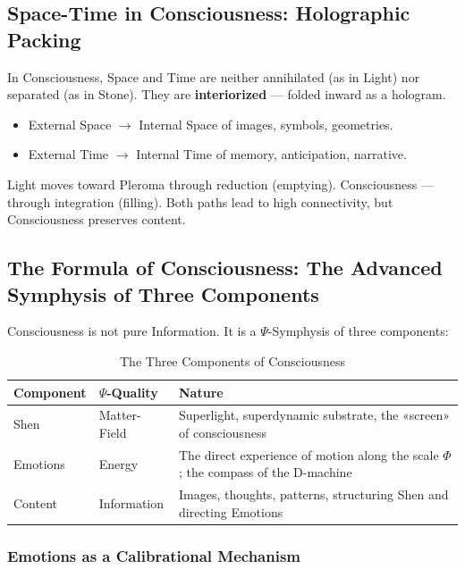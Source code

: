 \documentclass[a4paper,12pt]{article}
\begin{document}
	\subsection{Space-Time in Consciousness: Holographic Packing}
	
	In Consciousness, Space and Time are neither annihilated (as in Light) nor separated (as in Stone). They are \textbf{interiorized} — folded inward as a hologram.
	
	\begin{itemize}
		\item External Space $\to$ Internal Space of images, symbols, geometries.
		\item External Time $\to$ Internal Time of memory, anticipation, narrative.
	\end{itemize}
	
	Light moves toward Pleroma through reduction (emptying). Consciousness — through integration (filling). Both paths lead to high connectivity, but Consciousness preserves content.
	
	\subsection{The Formula of Consciousness: The Advanced Symphysis of Three Components}
	
	Consciousness is not pure Information. It is a $\Psi$-Symphysis of three components:
	
	\begin{table}[H]
		\centering
		\begin{tabular}{|p{3.5cm}|p{3.5cm}|p{8.5cm}|}
			\hline
			\textbf{Component} & \textbf{$\Psi$-Quality} & \textbf{Nature} \\
			\hline
			Shen & Matter-Field & Superlight, superdynamic substrate, the «screen» of consciousness \\
			\hline
			Emotions & Energy & The direct experience of motion along the scale $\Phi$; the compass of the D-machine \\
			\hline
			Content & Information & Images, thoughts, patterns, structuring Shen and directing Emotions \\
			\hline
		\end{tabular}
		\caption{The Three Components of Consciousness}
	\end{table}
	
	\subsubsection{Emotions as a Calibrational Mechanism}
	
\end{document}
